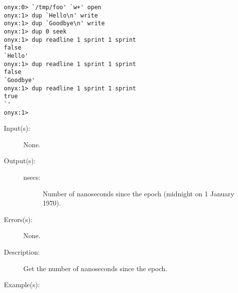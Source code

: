 \begin{description}
\begin{description}
\begin{verbatim}
onyx:0> `/tmp/foo' `w+' open
onyx:1> dup `Hello\n' write
onyx:1> dup `Goodbye\n' write
onyx:1> dup 0 seek
onyx:1> dup readline 1 sprint 1 sprint
false
`Hello'
onyx:1> dup readline 1 sprint 1 sprint
false
`Goodbye'
onyx:1> dup readline 1 sprint 1 sprint
true
`'
onyx:1>
		\end{verbatim}
	\end{description}
\label{systemdict:realtime}
\item[{\onyxop{--}{realtime}{nsecs}}: ]
	\begin{description}\item[]
	\item[Input(s): ] None.
	\item[Output(s): ]
		\begin{description}\item[]
		\item[nsecs: ]
			Number of nanoseconds since the epoch (midnight on 1
			January 1970).
		\end{description}
	\item[Errors(s): ] None.
	\item[Description: ]
		Get the number of nanoseconds since the epoch.
	\item[Example(s): ]\begin{verbatim}


\end{verbatim}
\end{description}
\end{description}
